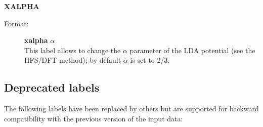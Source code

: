 \documentclass[12pt,a4paper]{article}
\begin{document}
\begin{description}
\begin{description}
\end{description} 

\item \textbf{XALPHA}
\begin{description} 
\item[Format:] \textbf{xalpha} $\alpha$ \\ This label allows to change the $\alpha$
  parameter of the LDA potential (see the HFS/DFT method); by default $\alpha$ is set
  to 2/3.
\end{description} 

\end{description} 


\subsection{Deprecated labels}

The following labels have been replaced by others but are supported for backward
compatibility with the previous version of the input data:
\end{document}
